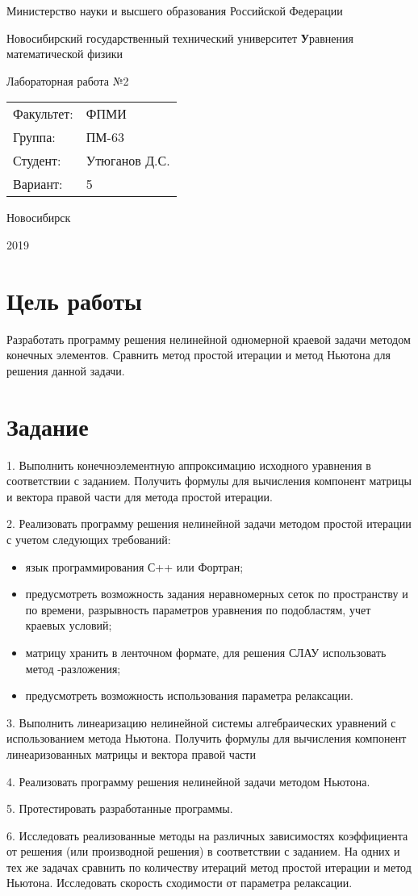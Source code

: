 \documentclass[12pt, a4paper]{article}
\newcommand{\insertTitle}[6]{
\begin{titlepage}
	\begin{center}
    	\large
		Министерство науки и высшего образования Российской Федерации
		
		Новосибирский государственный технический университет
		\vfill
		{\textbf #1}
		
		Лабораторная работа №#2
		\vfill
	\end{center}
	
	\begin{tabular}{ m{7em}  m{7em} }
	Факультет: & ФПМИ \\ 
	Группа: & #3 \\  
	Студент: & #4 \\
	Вариант: & #5
	\end{tabular}
	\vfill

\begin{center}
Новосибирск

#6
\end{center}
\end{titlepage}
}
\begin{document}
\setlength{\abovedisplayskip}{1pt}
\setlength{\belowdisplayskip}{1pt}

\insertTitle{Уравнения математической физики}{2}{ПМ-63}{Утюганов Д.С.}{5}{2019}


\section{Цель работы}
Разработать программу решения нелинейной одномерной краевой задачи методом конечных элементов. Сравнить метод простой итерации и метод Ньютона для решения данной задачи.


\section{Задание}
1.	Выполнить конечноэлементную аппроксимацию исходного уравнения в соответствии с заданием. Получить формулы для вычисления компонент матрицы   и вектора правой части   для метода простой итерации. 

2.	Реализовать программу решения нелинейной задачи методом простой итерации с учетом следующих требований:
\begin{itemize}[noitemsep]
\item язык программирования С++ или Фортран;
\item предусмотреть возможность задания неравномерных сеток по пространству и  по времени, разрывность параметров уравнения по подобластям, учет краевых условий;
\item матрицу хранить в ленточном формате, для решения СЛАУ использовать метод  -разложения;
\item предусмотреть возможность использования параметра релаксации.
\end{itemize}

3.	Выполнить линеаризацию нелинейной системы алгебраических уравнений с использованием метода Ньютона. Получить формулы для вычисления компонент линеаризованных матрицы   и вектора правой части  

4.	Реализовать программу решения нелинейной задачи методом Ньютона.

5.	Протестировать разработанные программы.

6.	Исследовать реализованные методы на различных зависимостях коэффициента от решения (или производной решения) в соответствии с заданием. На одних и тех же задачах сравнить по количеству итераций метод простой итерации и метод Ньютона. Исследовать скорость сходимости от параметра релаксации.
\end{document}
